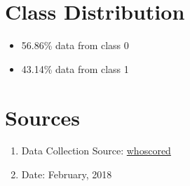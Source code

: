 \documentclass[10pt,a4paper]{article}
\begin{document}
\section{Class Distribution}
\begin{itemize}
      \item 56.86\% data from class 0
    \item 43.14\% data from class 1
\end{itemize}

\section{Sources}
    \begin{enumerate}
    \item Data Collection Source: \href{https://www.whoscored.com/Statistics}{whoscored} 
    \item Date: February, 2018
    \end{enumerate}
    
\end{document}
